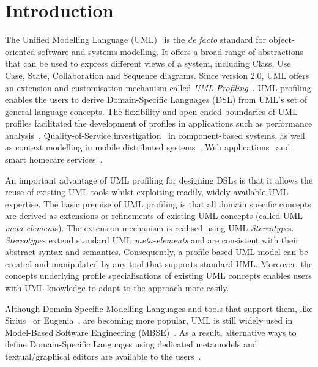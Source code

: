 \section{Introduction}
\label{sec:introduction}

The Unified Modelling Language (UML)~\cite{UML2015OMG} is the \emph{de facto} standard for object-oriented software and systems modelling. 
It offers a broad range of abstractions that can be used to express different views of a system, including Class, Use Case, State, Collaboration and Sequence diagrams. 
Since version 2.0, UML offers an extension and customisation mechanism called \emph{UML Profiling}~\cite{FuentesFernandez2004:UMLME}.
UML profiling enables the users to derive Domain-Specific Languages (DSL) from UML's set of general language concepts.
The flexibility and open-ended boundaries of UML profiles facilitated the development of profiles in applications such as performance analysis~\cite{xu2003performance}, Quality-of-Service investigation~\cite{cortellessa2004towards} in component-based systems, as well as context modelling in mobile distributed systems~\cite{Simons2007:JVLC}, Web applications~\cite{Moreno2007:IETS} and smart homecare services~\cite{Walderhaug2009:MODELS}. 

An important advantage of UML profiling for designing DSLs is that it allows the reuse of existing UML tools whilst exploiting readily, widely available UML expertise.
The basic premise of UML profiling is that all domain specific concepts are derived as extensions or refinements of existing UML concepts (called UML \textit{meta-element}s). 
The extension mechanism is realised using UML \textit{Stereotype}s. 
\textit{Stereotype}s extend standard UML \textit{meta-elements} and are consistent with their abstract syntax and semantics. 
Consequently, a profile-based UML model can be created and manipulated by any tool that supports standard UML. 
Moreover, the concepts underlying profile specialisations of existing UML concepts enables users with UML knowledge to adapt to the approach more easily.

Although Domain-Specific Modelling Languages and tools that support them, like Sirius~\cite{viyovic2014sirius} or Eugenia~\cite{kolovos2015eugenia}, are becoming more popular, UML is still widely used in Model-Based Software Engineering (MBSE)~\cite{erickson2007theoretical}. 
As a result, alternative ways to define Domain-Specific Languages using dedicated metamodels and textual/graphical editors are available to the users~\cite{Bergmayr2014:MODELS,Pardillo2010:MODELS}. 

